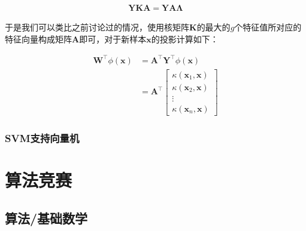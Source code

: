 \documentclass[UTF8]{book}
\begin{document}
\begin{large}
    \begin{equation}
        \begin{aligned}
            \mathbf{Y}\mathbf{K}\mathbf{A} = \mathbf{Y}\mathbf{A}\mathbf{\Lambda}
            \nonumber
        \end{aligned}
    \end{equation}
\end{large}
于是我们可以类比之前讨论过的情况，使用核矩阵$\mathbf{K}$的最大的$g$个特征值所对应的特征向量构成矩阵$\mathbf{A}$即可，对于新样本$\mathbf{x}$的投影计算如下：
\begin{large}
    \begin{equation}
        \begin{aligned}
            \mathbf{W}^\top \phi(\mathbf{x}) &= \mathbf{A}^\top\mathbf{Y}^\top\phi(\mathbf{x}) \\
            &= \mathbf{A}^\top
            \begin{bmatrix}
                \kappa (\mathbf{x}_1,\mathbf{x}) \\
                \kappa (\mathbf{x}_2,\mathbf{x}) \\
                 \vdots  \\
                \kappa (\mathbf{x}_n,\mathbf{x})
            \end{bmatrix}
            \nonumber
        \end{aligned}
    \end{equation}
\end{large}


\subsection{SVM支持向量机}


\chapter{算法竞赛}

\section{算法/基础数学}
\end{document}
